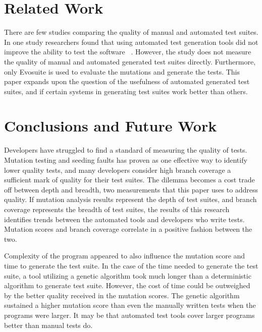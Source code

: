 \documentclass[conference]{IEEEtran}
\begin{document}
\section{Related Work}
\label{sec:related_work}
There are few studies comparing the quality of manual and automated test suites. In one study researchers found that using automated test generation tools did not improve the ability to test the software ~\cite{Fraser:2013:AWT:2483760.2483774}. However, the study does not measure the quality of manual and automated generated test suites directly. Furthermore, only Evosuite is used to evaluate the mutations and generate the tests. This paper expands upon the question of the usefulness of automated generated test suites, and if certain systems in generating test suites work better than others.


\section{Conclusions and Future Work}
\label{sec:conclusion}
Developers have struggled to find a standard of measuring the quality of tests. Mutation testing and seeding faults has proven as one effective way to identify lower quality tests, and many developers consider high branch coverage a sufficient mark of quality for their test suites. The dilemma becomes a cost trade off between depth and breadth, two measurements that this paper uses to address quality. If mutation analysis results represent the depth of test suites, and branch coverage represents the breadth of test suites, the results of this research identifies trends between the automated tools and developers who write tests. Mutation scores and branch coverage correlate in a positive fashion between the two.

Complexity of the program appeared to also influence the mutation score and time to generate the test suite. In the case of the time needed to generate the test suite, a tool utilizing a genetic algorithm took much longer than a deterministic algorithm to generate test suite. However, the cost of time could be outweighed by the better quality received in the mutation scores. The genetic algorithm sustained a higher mutation score than even the manually written tests when the programs were larger. It may be that automated test tools cover larger programs better than manual tests do.
\end{document}
